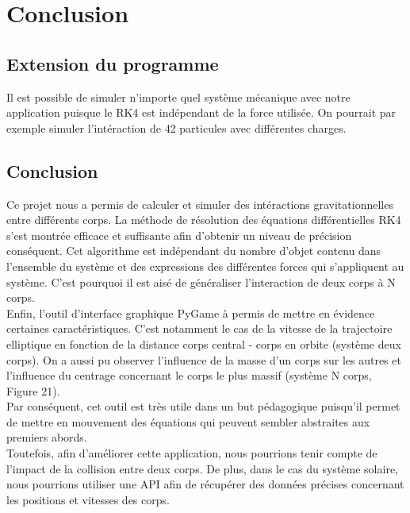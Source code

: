 \documentclass[a4paper, 12pt]{article}
\begin{document}
\section{Conclusion}
\subsection{Extension du programme}
Il est possible de simuler n'importe quel système mécanique avec notre application puisque le RK4 est indépendant de la force utilisée. On pourrait par exemple simuler l'intéraction de 42 particules avec différentes charges.

\subsection{Conclusion}
Ce projet nous a permis de calculer et simuler des intéractions gravitationnelles entre différents corps. 
La méthode de résolution des équations différentielles RK4 s’est montrée efficace et suffisante afin d’obtenir un niveau de précision conséquent. 
Cet algorithme est indépendant du nombre d’objet contenu dans l’ensemble du système et des expressions des différentes forces qui s'appliquent au système. C’est pourquoi il est aisé de généraliser l’interaction de deux corps à N corps.\\

Enfin, l’outil d’interface graphique PyGame à permis de mettre en évidence certaines caractéristiques.
C’est notamment le cas de la vitesse de la trajectoire elliptique en fonction de la distance corps central - corps en orbite (système deux corps).
On a aussi pu observer l’influence de la masse d’un corps sur les autres et l'influence du centrage concernant le corps le plus massif (système N corps, Figure 21).\\

Par conséquent, cet outil est très utile dans un but pédagogique puisqu'il permet de mettre en mouvement des équations qui peuvent sembler abstraites aux premiers abords. \\

Toutefois, afin d'améliorer cette application, nous pourrions tenir compte de l'impact de la collision entre deux corps. De plus, dans le cas du système solaire, nous pourrions utiliser une API afin de récupérer des données précises concernant les positions et vitesses des corps.
\end{document}
